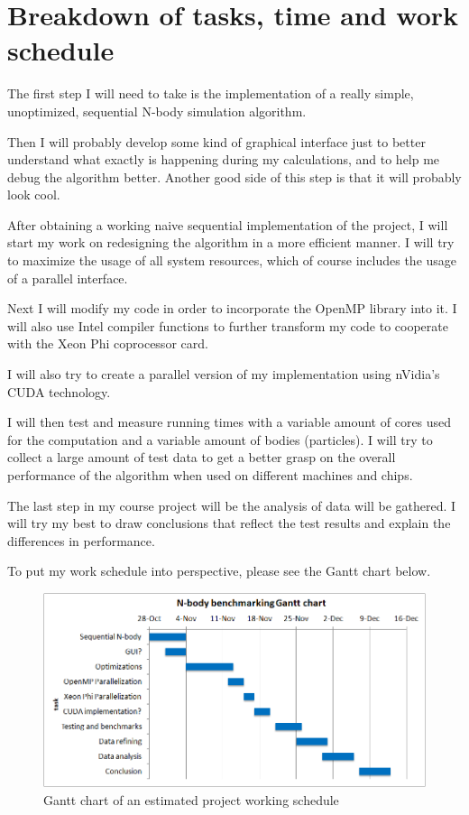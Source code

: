 \documentclass[12pt]{article}
\begin{document}
\section{Breakdown of tasks, time and work schedule}
The first step I will need to take is the implementation of a really simple, unoptimized, sequential N-body simulation algorithm. 

Then I will probably develop some kind of graphical interface just to better understand what exactly is happening during my calculations, and to help me debug the algorithm better. Another good side of this step is that it will probably look cool.

After obtaining a working naive sequential implementation of the project, I will start my work on redesigning the algorithm in a more efficient manner. I will try to maximize the usage of all system resources, which of course includes the usage of a parallel interface.

Next I will modify my code in order to incorporate the OpenMP library into it. I will also use Intel compiler functions to further transform my code to cooperate with the Xeon Phi coprocessor card.

I will also try to create a parallel version of my implementation using nVidia’s CUDA technology.

I will then test and measure running times with a variable amount of cores used for the computation and a variable amount of bodies (particles). I will try to collect a large amount of test data to get a better grasp on the overall performance of the algorithm when used on different machines and chips.

The last step in my course project will be the analysis of data will be gathered. I will try my best to draw conclusions that reflect the test results and explain the differences in performance.

To put my work schedule into perspective, please see the Gantt chart below.

\begin{figure}[ht]
	\centering
	\includegraphics[width=\textwidth]{ganttchart.png}
	\caption{Gantt chart of an estimated project working schedule}
\end{figure} 

\pagebreak


\end{document}
